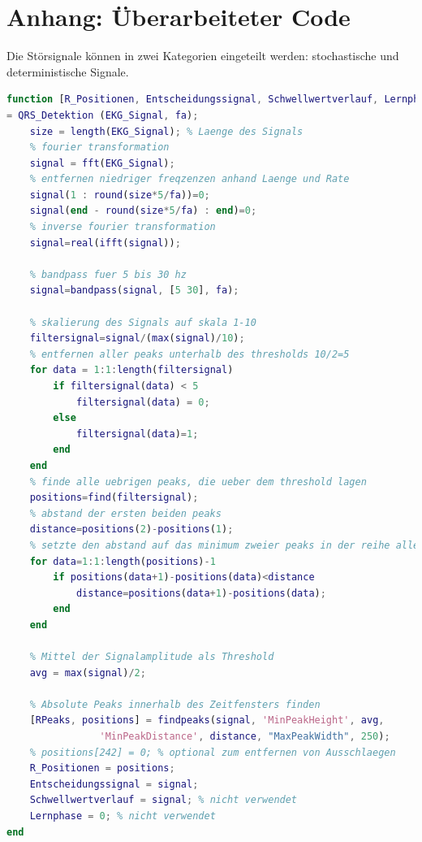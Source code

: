\documentclass[a4paper,12pt,titlepage]{scrartcl}
\begin{document}
\listoffigures

\newpage
\section{Anhang: Überarbeiteter Code}
Die Störsignale können in zwei Kategorien eingeteilt werden: stochastische und deterministische Signale.

\begin{lstlisting}[basicstyle=\scriptsize, language=matlab]
function [R_Positionen, Entscheidungssignal, Schwellwertverlauf, Lernphase] 
= QRS_Detektion (EKG_Signal, fa);
    size = length(EKG_Signal); % Laenge des Signals
    % fourier transformation
    signal = fft(EKG_Signal);
    % entfernen niedriger freqzenzen anhand Laenge und Rate
    signal(1 : round(size*5/fa))=0;
    signal(end - round(size*5/fa) : end)=0;
    % inverse fourier transformation
    signal=real(ifft(signal));
    
    % bandpass fuer 5 bis 30 hz
    signal=bandpass(signal, [5 30], fa);
    
    % skalierung des Signals auf skala 1-10
    filtersignal=signal/(max(signal)/10);
    % entfernen aller peaks unterhalb des thresholds 10/2=5
    for data = 1:1:length(filtersignal)
        if filtersignal(data) < 5
            filtersignal(data) = 0;
        else
            filtersignal(data)=1;
        end
    end
    % finde alle uebrigen peaks, die ueber dem threshold lagen
    positions=find(filtersignal);
    % abstand der ersten beiden peaks
    distance=positions(2)-positions(1);
    % setzte den abstand auf das minimum zweier peaks in der reihe aller uebrigen peaks
    for data=1:1:length(positions)-1
        if positions(data+1)-positions(data)<distance
            distance=positions(data+1)-positions(data);
        end
    end
    
    % Mittel der Signalamplitude als Threshold
    avg = max(signal)/2; 
    
    % Absolute Peaks innerhalb des Zeitfensters finden
    [RPeaks, positions] = findpeaks(signal, 'MinPeakHeight', avg, 
                'MinPeakDistance', distance, "MaxPeakWidth", 250);
    % positions[242] = 0; % optional zum entfernen von Ausschlaegen
    R_Positionen = positions;
    Entscheidungssignal = signal;
    Schwellwertverlauf = signal; % nicht verwendet
    Lernphase = 0; % nicht verwendet
end
\end{lstlisting}
\end{document}
